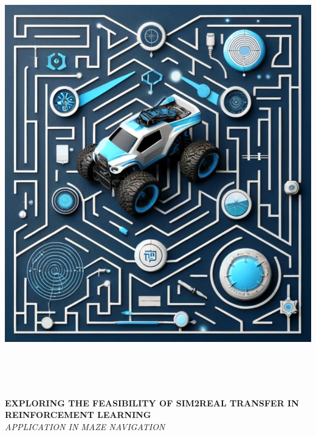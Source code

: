\documentclass{article}
\begin{document}
\begin{titlepage}
    \selectfont
    
    \begin{center}
        \includegraphics[width=18.5cm,height=18.5cm]{./cover_image.png}
    \end{center}
    \begin{adjustwidth}{1.5cm}{1.5cm}

    \vspace{0.5em}

    \MakeUppercase{\huge\textbf{Exploring the Feasibility of Sim2Real Transfer in Reinforcement Learning}} \\
    \MakeUppercase{\Large\textit{Application in Maze Navigation}}


\end{adjustwidth}
\end{titlepage}
\end{document}
